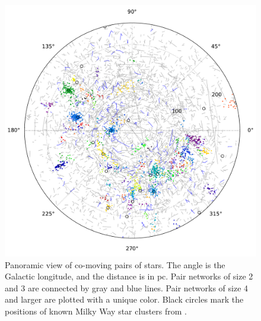 \documentclass[manuscript, letterpaper]{aastex6}
\begin{document}
\begin{figure}[p]
  \begin{center}
    \includegraphics[width=\textwidth]{figures/glon_d_pie.pdf}
  \end{center}
  \caption{%
    Panoramic view of co-moving pairs of stars. The angle is the Galactic
    longitude, and the distance is in pc.
    Pair networks of size 2 and 3 are connected by gray and blue lines.
    Pair networks of size 4 and larger are plotted with a unique color.
    Black circles mark the positions of known Milky Way star clusters
    from \citet{Kharchenko:2016aa}.
    \label{fig:glon_d_pairlines}}
\end{figure}

\end{document}
